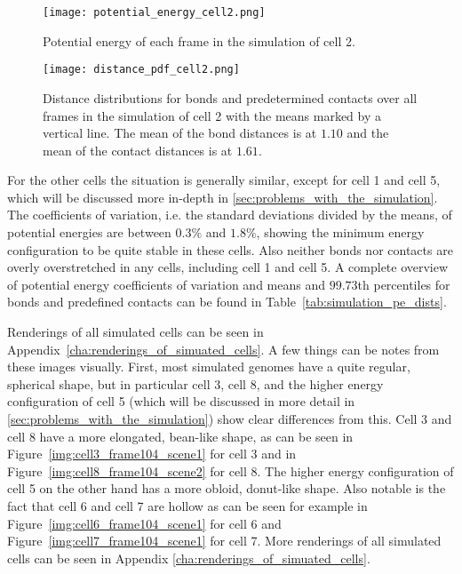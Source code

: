 \begin{figure}[ht]
\centering
  \texttt{[image: potential\_energy\_cell2.png]}
  \caption{Potential energy of each frame in the simulation of cell 2.}
  \label{fig:potential_energy_cell2}
\end{figure}

\begin{figure}[ht]
\centering
  \texttt{[image: distance\_pdf\_cell2.png]}
  \caption{Distance distributions for bonds and predetermined contacts over all frames in the simulation of cell 2 with the means marked by a vertical line. The mean of the bond distances is at \(\num{1.10}\) and the mean of the contact distances is at \(\num{1.61}\).}
  \label{fig:distance_pdf_cell2}
\end{figure}

For the other cells the situation is generally similar, except for cell 1 and cell 5, which will be discussed more in-depth in \ref{sec:problems_with_the_simulation}. The coefficients of variation, i.e. the standard deviations divided by the means, of potential energies are between \(0.3\%\) and \(1.8\%\), showing the minimum energy configuration to be quite stable in these cells. Also neither bonds nor contacts are overly overstretched in any cells, including cell 1 and cell 5. A complete overview of potential energy coefficients of variation and means and \(99.73\)th percentiles for bonds and predefined contacts can be found in Table~\ref{tab:simulation_pe_dists}.

Renderings of all simulated cells can be seen in Appendix~\ref{cha:renderings_of_simuated_cells}. A few things can be notes from these images visually. First, most simulated genomes have a quite regular, spherical shape, but in particular cell 3, cell 8, and the higher energy configuration of cell 5 (which will be discussed in more detail in \ref{sec:problems_with_the_simulation}) show clear differences from this. Cell 3 and cell 8 have a more elongated, bean-like shape, as can be seen in Figure~\ref{img:cell3_frame104_scene1} for cell 3 and in Figure~\ref{img:cell8_frame104_scene2} for cell 8. The higher energy configuration of cell 5 on the other hand has a more obloid, donut-like shape. Also notable is the fact that cell 6 and cell 7 are hollow as can be seen for example in Figure~\ref{img:cell6_frame104_scene1} for cell 6 and Figure~\ref{img:cell7_frame104_scene1} for cell 7. More renderings of all simulated cells can be seen in Appendix \ref{cha:renderings_of_simuated_cells}.


